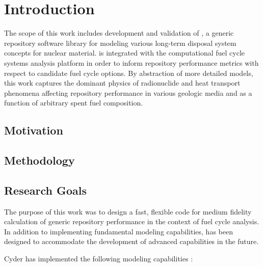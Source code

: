\chapter{Introduction}\label{ch:introduction}


The scope of this work includes development and validation of \Cyder, a generic 
repository software library for modeling various long-term disposal system concepts 
for nuclear material. \Cyder is integrated with the \Cyclus 
computational fuel cycle systems analysis platform in order to inform 
repository performance metrics with respect to candidate fuel cycle options.  
By abstraction of more detailed models, this work captures the dominant physics 
of radionuclide and heat transport phenomena affecting repository performance 
in various geologic media and as a function of arbitrary spent fuel 
composition. 

\section{Motivation} 


\section{Methodology} 


\section{Research Goals}

The purpose of this work was to design a fast, flexible code for medium fidelity 
calculation of generic repository performance in the context of fuel cycle 
analysis. In addition to implementing fundamental modeling capabilities, \Cyder 
has been designed to accommodate the development of advanced capabilities in the 
future.

Cyder has implemented the following modeling capabilities :

